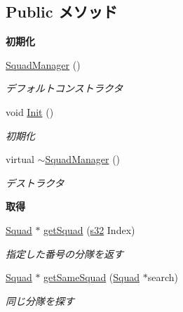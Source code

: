 \subsection*{Public メソッド}
\begin{Indent}{\bf 初期化}\par
\begin{DoxyCompactItemize}
\item 
\hyperlink{class_squad_manager_aeba8839cdfa705ca17e496ccbb7da4ec}{Squad\-Manager} ()
\begin{DoxyCompactList}\small\item\em デフォルトコンストラクタ \end{DoxyCompactList}\item 
void \hyperlink{class_squad_manager_aff78a2b641fbd6f4befba2f79f959254}{Init} ()
\begin{DoxyCompactList}\small\item\em 初期化 \end{DoxyCompactList}\item 
virtual \hyperlink{class_squad_manager_a6c9a70cc98dcc68d75a04ef4058313ea}{$\sim$\-Squad\-Manager} ()
\begin{DoxyCompactList}\small\item\em デストラクタ \end{DoxyCompactList}\end{DoxyCompactItemize}
\end{Indent}
\begin{Indent}{\bf 取得}\par
\begin{DoxyCompactItemize}
\item 
\hyperlink{class_squad}{Squad} $\ast$ \hyperlink{class_squad_manager_a2918b25e8247fbea0131e1221a45c06a}{get\-Squad} (\hyperlink{_main_8h_a0ce6887c26c1c49ad3be5710dd42bfd6}{s32} Index)
\begin{DoxyCompactList}\small\item\em 指定した番号の分隊を返す \end{DoxyCompactList}\item 
\hyperlink{class_squad}{Squad} $\ast$ \hyperlink{class_squad_manager_a9f3ed215f78f979591d38f8a375ed522}{get\-Same\-Squad} (\hyperlink{class_squad}{Squad} $\ast$search)
\begin{DoxyCompactList}\small\item\em 同じ分隊を探す \end{DoxyCompactList}\end{DoxyCompactItemize}
\end{Indent}
